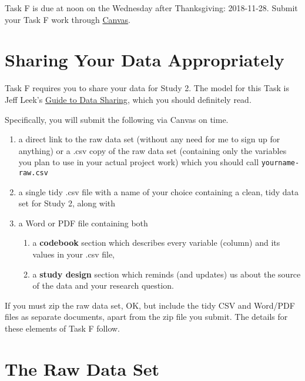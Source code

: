 \documentclass[]{book}
\providecommand{\tightlist}{%
  \setlength{\itemsep}{0pt}\setlength{\parskip}{0pt}}
\theoremstyle{definition}
\theoremstyle{definition}
\theoremstyle{definition}
\theoremstyle{remark}
\begin{document}
Task F is due at noon on the Wednesday after Thanksgiving: 2018-11-28.
Submit your Task F work through \href{https://canvas.case.edu/}{Canvas}.

\hypertarget{sharing-your-data-appropriately}{%
\section{Sharing Your Data
Appropriately}\label{sharing-your-data-appropriately}}

Task F requires you to share your data for Study 2. The model for this
Task is Jeff Leek's \href{https://github.com/jtleek/datasharing}{Guide
to Data Sharing}, which you should definitely read.

Specifically, you will submit the following via Canvas on time.

\begin{enumerate}
\def\labelenumi{\arabic{enumi}.}
\tightlist
\item
  a direct link to the raw data set (without any need for me to sign up
  for anything) or a .csv copy of the raw data set (containing only the
  variables you plan to use in your actual project work) which you
  should call \texttt{yourname-raw.csv}
\item
  a single tidy .csv file with a name of your choice containing a clean,
  tidy data set for Study 2, along with
\item
  a Word or PDF file containing both

  \begin{enumerate}
  \def\labelenumii{\alph{enumii}.}
  \tightlist
  \item
    a \textbf{codebook} section which describes every variable (column)
    and its values in your .csv file,
  \item
    a \textbf{study design} section which reminds (and updates) us about
    the source of the data and your research question.
  \end{enumerate}
\end{enumerate}

If you must zip the raw data set, OK, but include the tidy CSV and
Word/PDF files as separate documents, apart from the zip file you
submit. The details for these elements of Task F follow.

\hypertarget{the-raw-data-set}{%
\section{The Raw Data Set}\label{the-raw-data-set}}
\end{document}
